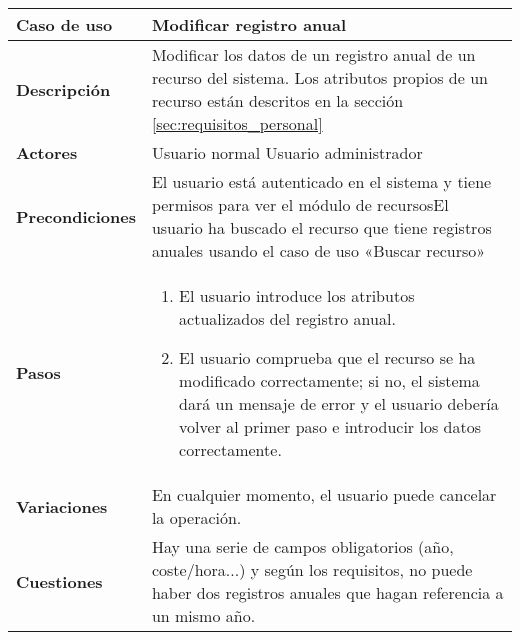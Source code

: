 \begin{tabular}{|p{1.25in}|p{3.65in}|}\hline
\textbf{Caso de uso} & \textbf{Modificar registro anual}\\\hline\hline
\textbf{Descripción} & Modificar los datos de un registro anual de un recurso
del sistema. Los atributos propios de un recurso están descritos en la sección
\ref{sec:requisitos_personal}\\\hline
\textbf{Actores} & Usuario normal \newline Usuario administrador\\\hline
\textbf{Precondiciones} & El usuario está autenticado en el sistema y
tiene permisos para ver el módulo de recursos\newline El usuario ha
buscado el recurso que tiene registros anuales usando el caso de uso «Buscar
recurso»\\\hline
\textbf{Pasos} &
  \begin{enumerate}
   \item El usuario introduce los atributos actualizados del registro anual.
   \item El usuario comprueba que el recurso se ha modificado correctamente; si
no, el sistema dará un mensaje de error y el usuario debería volver al primer
paso e introducir los datos correctamente.
  \end{enumerate}
\\\hline
\textbf{Variaciones} & En cualquier momento, el usuario puede cancelar
la operación.\\\hline
\textbf{Cuestiones} & Hay una serie de campos obligatorios (año,
coste/hora...) y según los requisitos, no puede haber dos registros
anuales que hagan referencia a un mismo año.\\\hline
\end{tabular}

